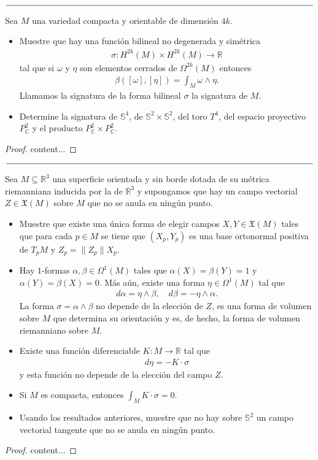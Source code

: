 \documentclass[11pt]{article}
\newcommand{\R}{\mathbb{R}}
\newcommand{\C}{\mathbb{C}}
\newcommand{\Ss}{\mathbb{S}}
\newcommand{\X}{\mathfrak{X}}
\newcommand{\paint}[1]{\color{color}{#1}}
\newcommand{\paintline}{\begin{center}
$\paint{
\rule{400pt}{0.5pt}
}$
\vspace{10pt}
\end{center}}
\newenvironment{exercise}[2][Ejercicio]{\begin{trivlist}
\item[\hskip \labelsep \paint{{\bfseries #1}}\hskip \labelsep {\bfseries #2.}]}{\end{trivlist}}
\begin{document}
\paintline

\begin{exercise}{6} Sea $M$ una variedad compacta y orientable de dimensión $4k$.
\begin{itemize}
\item[(a)] Muestre que hay una función bilineal no degenerada y simétrica
\begin{align*}
\sigma : H^{2k}(M) \times H^{2k}(M) \to \R
\end{align*}
tal que si $\omega$ y $\eta$ son elementos cerrados de $\Omega^{2k}(M)$ entonces 
\begin{align*}
\beta([\omega],[\eta]) = \int_M \omega \wedge \eta.
\end{align*}
Llamamos la signatura de la forma bilineal $\sigma$ la signatura de $M$.
\item[(b)] Determine la signatura de $\Ss^4$, de $\Ss^2 \times \Ss^2$, del toro $T^4$, del espacio proyectivo $P_{\C}^2$ y el producto $P_{\C}^2 \times P_{\C}^2$.
\end{itemize}
\end{exercise}
\begin{proof}
content...
\end{proof}

\paintline

\begin{exercise}{7} Sea $M \subseteq \R^3$ una superficie orientada y sin borde dotada de su métrica riemanniana inducida por la de $\R^3$ y supongamos que hay un campo vectorial $Z \in \X(M)$ sobre $M$ que no se anula en ningún punto.
\begin{itemize}
\item[(a)] Muestre que existe una única forma de elegir campos $X,Y \in \X(M)$ tales que para cada $p \in M$ se tiene que $(X_p,Y_p)$ es una base ortonormal positiva de $T_pM$ y $Z_p = \|Z_p\|X_p$. 
\item[(b)] Hay $1$-formas $\alpha,\beta\in \Omega^1(M)$ tales que $\alpha(X) = \beta(Y) = 1$ y $\alpha(Y) = \beta(X) = 0$. Más aún, existe una forma $\eta \in \Omega^1(M)$ tal que
\begin{align*}
d\alpha = \eta \wedge \beta, \quad d\beta = -\eta \wedge \alpha.
\end{align*}
La forma $\sigma  = \alpha \wedge \beta$ no depende de la elección de $Z$, es una forma de volumen sobre $M$ que determina su orientación y es, de hecho, la forma de volumen riemanniano sobre $M$.
\item[(c)] Existe una función diferenciable $K : M \to \R$ tal que
\begin{align*}
d\eta = -K \cdot \sigma
\end{align*}
y esta función no depende de la elección del campo $Z$.
\item[(d)] Si $M$ es compacta, entonces $\int_M K \cdot \sigma = 0$.
\item[(e)] Usando los resultados anteriores, muestre que no hay sobre $\Ss^2$ un campo vectorial tangente que no se anula en ningún punto.
\end{itemize}
\end{exercise}
\begin{proof}
content...
\end{proof}
\end{document}
